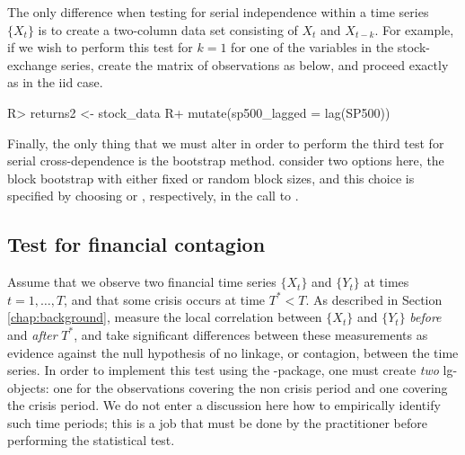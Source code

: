 The only difference when testing for serial independence within a time series \(\{X_t\}\) is to create a two-column data set consisting of
\(X_t\) and \(X_{t-k}\). For example, if we wish to perform this test for \(k=1\) for one of the variables in the stock-exchange series,
create the matrix of observations as below, and proceed exactly as in the iid case.

\begin{example}
R> returns2 <- stock_data %
R+   mutate(sp500_lagged = lag(SP500))
\end{example}

Finally, the only thing that we must alter in order to perform the third test for serial cross-dependence is the bootstrap method. \citet{laca:tjos:2018} consider two options here, the block bootstrap with either fixed \citep{kuns:1989} or random \citep{poli:roma:1994} block sizes, and this choice is specified by choosing  or , respectively, in the call to .

\subsection{Test for financial contagion}\label{chap:cont}

Assume that we observe two financial time series \(\{X_t\}\) and \(\{Y_t\}\) at times \(t = 1,\ldots,T\), and that some crisis occurs at time \(T^* < T\). As described in Section \ref{chap:background}, \citet{stov:tjos:huft:2014} measure the local correlation between \(\{X_t\}\) and \(\{Y_t\}\) \emph{before} and \emph{after} \(T^*\), and take significant differences between these measurements as evidence against the null hypothesis of no linkage, or contagion, between the time series. In order to implement this test using the -package, one must create \emph{two} lg-objects: one for the observations covering the non crisis period and one covering the crisis period. We do not enter a discussion here how to empirically identify such time periods; this is a job that must be done by the practitioner before performing the statistical test.

